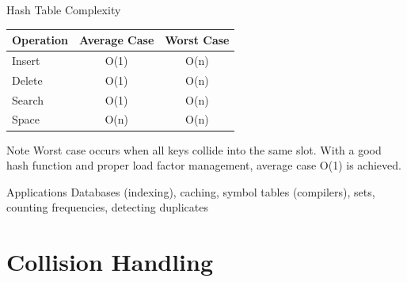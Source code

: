 \documentclass[aspectratio=169,xcolor=dvipsnames]{beamer}
\begin{document}
\begin{frame}{Hash Table Complexity}
  \begin{table}
    \centering
    \begin{tabular}{l|c|c}
      \toprule
      \textbf{Operation} & \textbf{Average Case} & \textbf{Worst Case} \\
      \midrule
      Insert & O(1) & O(n) \\
      Delete & O(1) & O(n) \\
      Search & O(1) & O(n) \\
      Space & O(n) & O(n) \\
      \bottomrule
    \end{tabular}
  \end{table}

  \vspace{0.3cm}

  \begin{alertblock}{Note}
    Worst case occurs when all keys collide into the same slot. With a good hash function and proper load factor management, average case O(1) is achieved.
  \end{alertblock}

  \vspace{0.3cm}

  \begin{exampleblock}{Applications}
    Databases (indexing), caching, symbol tables (compilers), sets, counting frequencies, detecting duplicates
  \end{exampleblock}
\end{frame}

\section{Collision Handling}
\end{document}
